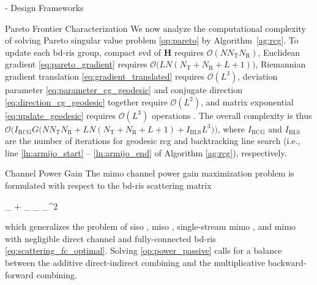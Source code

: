 \documentclass[journal]{IEEEtran}
\begin{document}
\begin{section}{- Design Frameworks}
\begin{subsection}{Pareto Frontier Characterization}
		We now analyze the computational complexity of solving Pareto singular value problem \eqref{op:pareto} by Algorithm~\ref{ag:rcg}.
		To update each \gls{bd}-\gls{ris} group, compact \gls{svd} of $\mathbf{H}$ requires $\mathcal{O}(N N_\mathrm{T} N_\mathrm{R})$, Euclidean gradient \eqref{eq:pareto_gradient} requires $\mathcal{O}\bigl(L N (N_\mathrm{T}+N_\mathrm{R}+L+1) \bigr)$, Riemannian gradient translation \eqref{eq:gradient_translated} requires $\mathcal{O}(L^3)$, deviation parameter \eqref{eq:parameter_cg_geodesic} and conjugate direction \eqref{eq:direction_cg_geodesic} together require $\mathcal{O}(L^2)$, and matrix exponential \eqref{eq:update_geodesic} requires $\mathcal{O}(L^3)$ operations \cite{Moler2003}.
		The overall complexity is thus $\mathcal{O}\bigl(I_\text{RCG} G \bigl(N N_\mathrm{T} N_\mathrm{R} + L N (N_\mathrm{T}+N_\mathrm{R}+L+1) + I_\text{BLS} L^3\bigr)\bigr)$, where $I_\text{RCG}$ and $I_\text{BLS}$ are the number of iterations for geodesic \gls{rcg} and backtracking line search (i.e., line \ref{ln:armijo_start} -- \ref{ln:armijo_end} of Algorithm \ref{ag:rcg}), respectively.
	\end{subsection}

	\begin{subsection}{Channel Power Gain}\label{sc:power}
		The \gls{mimo} channel power gain maximization problem is formulated with respect to the \gls{bd}-\gls{ris} scattering matrix
		\begin{maxi!}
			{\scriptstyle{\mathbf{\Theta}}}{\lVert {}_ + _ \mathbf{\Theta} _ \rVert _^2}{\label{op:power_passive}}{\label{ob:power_passive}}
		\end{maxi!}
		which generalizes the problem of \gls{siso} \cite{Shen2020a}, \gls{miso} \cite{Santamaria2023,Fang2023}, single-stream \gls{mimo} \cite{Nerini2023,Nerini2023b}, and \gls{mimo} with negligible direct channel and fully-connected \gls{bd}-\gls{ris} \eqref{eq:scattering_fc_optimal}.
		Solving \eqref{op:power_passive} calls for a balance between the additive direct-indirect combining and the multiplicative backward-forward combining.


\end{subsection}
\end{section}
\end{document}
